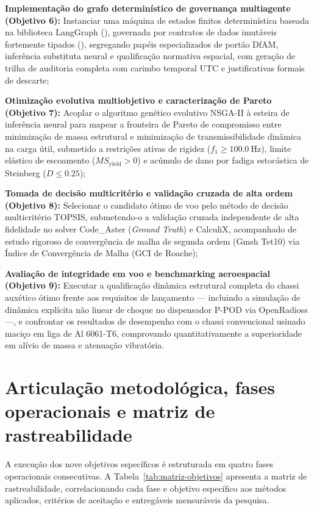 \begin{alineas}
  \item \textbf{Implementação do grafo determinístico de governança multiagente (Objetivo 6):} Instanciar uma máquina de estados finitos determinística baseada na biblioteca LangGraph (), governada por contratos de dados imutáveis fortemente tipados (), segregando papéis especializados de portão DfAM, inferência substituta neural e qualificação normativa espacial, com geração de trilha de auditoria completa com carimbo temporal UTC e justificativas formais de descarte;
  \item \textbf{Otimização evolutiva multiobjetivo e caracterização de Pareto (Objetivo 7):} Acoplar o algoritmo genético evolutivo NSGA-II à esteira de inferência neural para mapear a fronteira de Pareto de compromisso entre minimização de massa estrutural e minimização de transmissibilidade dinâmica na carga útil, submetido a restrições ativas de rigidez ($f_1 \ge \SI{100.0}{\hertz}$), limite elástico de escoamento ($MS_{\text{yield}} > 0$) e acúmulo de dano por fadiga estocástica de Steinberg ($D \le \num{0.25}$);
  \item \textbf{Tomada de decisão multicritério e validação cruzada de alta ordem (Objetivo 8):} Selecionar o candidato ótimo de voo pelo método de decisão multicritério TOPSIS, submetendo-o a validação cruzada independente de alta fidelidade no solver Code\_Aster (\textit{Ground Truth}) e CalculiX, acompanhado de estudo rigoroso de convergência de malha de segunda ordem (Gmsh Tet10) via Índice de Convergência de Malha (GCI de Roache);
  \item \textbf{Avaliação de integridade em voo e benchmarking aeroespacial (Objetivo 9):} Executar a qualificação dinâmica estrutural completa do chassi auxético ótimo frente aos requisitos de lançamento — incluindo a simulação de dinâmica explícita não linear de choque no dispensador P-POD via OpenRadioss —, e confrontar os resultados de desempenho com o chassi convencional usinado maciço em liga de Al 6061-T6, comprovando quantitativamente a superioridade em alívio de massa e atenuação vibratória.
\end{alineas}

\section{Articulação metodológica, fases operacionais e matriz de rastreabilidade}
\label{sec:articulacao-objetivos}

A execução dos nove objetivos específicos é estruturada em quatro fases operacionais consecutivas. A Tabela~\ref{tab:matriz-objetivos} apresenta a matriz de rastreabilidade, correlacionando cada fase e objetivo específico aos métodos aplicados, critérios de aceitação e entregáveis mensuráveis da pesquisa.

